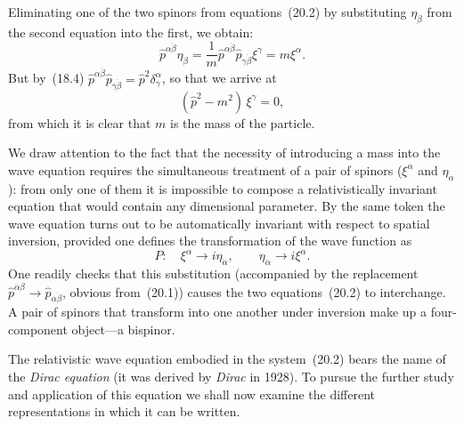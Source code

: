 Eliminating one of the two spinors from equations~(20.2) by substituting $\eta_{\dot\beta}$ from the second equation into the first, we obtain:
\[
\widehat p^{\alpha\dot\beta}\eta_{\dot\beta} = \frac{1}{m}\widehat p^{\alpha\dot\beta}\widehat p_{\gamma\dot\beta}\xi^\gamma = m\xi^\alpha.
\]
But by~(18.4) $\widehat p^{\alpha\dot\beta}\widehat p_{\gamma\dot\beta} = \widehat p^2\delta^\alpha_\gamma$, so that we arrive at
\begin{equation}
(\widehat p^2 - m^2)\,\xi^\gamma = 0,
\tag{20.3}
\end{equation}
from which it is clear that $m$ is the mass of the particle.

We draw attention to the fact that the necessity of introducing a mass into the wave equation requires the simultaneous treatment of
a pair of spinors ($\xi^\alpha$ and $\eta_{\dot\alpha}$): from only one of them it is impossible to compose a relativistically invariant equation that would contain any dimensional parameter. By the same token the wave equation turns out to be automatically invariant with respect to spatial inversion, provided one defines the transformation of the wave function as
\begin{equation}
P:\quad \xi^\alpha \to i\eta_{\dot\alpha},\qquad \eta_{\dot\alpha} \to i\xi^\alpha.
\tag{20.4}
\end{equation}
One readily checks that this substitution (accompanied by the replacement $\widehat p^{\dot\alpha\beta} \to \widehat p_{\alpha\dot\beta}$, obvious from~(20.1)) causes the two equations~(20.2) to interchange. A pair of spinors that transform into one another under inversion make up a four-component object---a bispinor.

The relativistic wave equation embodied in the system~(20.2) bears the name of the \emph{Dirac equation} (it was derived by \emph{Dirac} in 1928). To pursue the further study and application of this equation we shall now examine the different representations in which it can be written.

